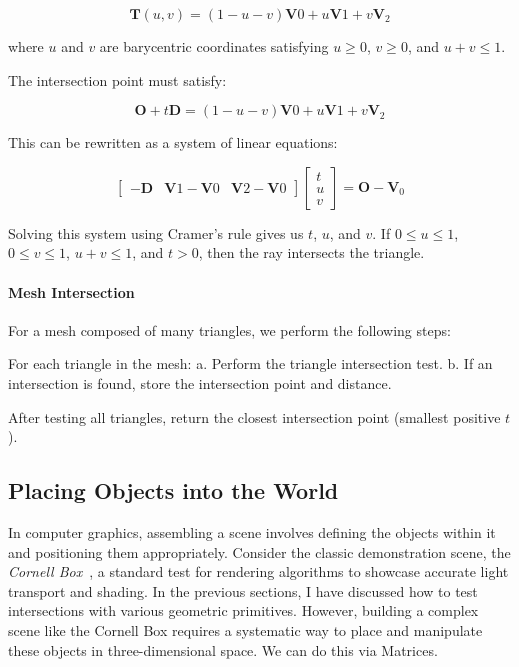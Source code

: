 \documentclass[12pt]{article}
\begin{document}
\[
    \mathbf{T}(u,v) = (1-u-v)\mathbf{V}0 + u\mathbf{V}1 + v\mathbf{V}_2
\]

where \(u\) and \(v\) are barycentric coordinates satisfying \(u \geq 0\), \(v \geq 0\), and \(u + v \leq 1\).

The intersection point must satisfy:

\[
    \mathbf{O} + t\mathbf{D} = (1-u-v)\mathbf{V}0 + u\mathbf{V}1 + v\mathbf{V}_2
\]

This can be rewritten as a system of linear equations:

\[
    \begin{bmatrix}
        -\mathbf{D} & \mathbf{V}1 - \mathbf{V}0 & \mathbf{V}2 - \mathbf{V}0
    \end{bmatrix}
    \begin{bmatrix}
        t \\ u \\ v
    \end{bmatrix}
    = \mathbf{O} - \mathbf{V}_0
\]

Solving this system using Cramer's rule gives us \(t\), \(u\), and \(v\). If \(0 \leq u \leq 1\), \(0 \leq v \leq 1\), \(u + v \leq 1\), and \(t > 0\), then the ray intersects the triangle.

\paragraph{Mesh Intersection}

For a mesh composed of many triangles, we perform the following steps:

For each triangle in the mesh:
a. Perform the triangle intersection test.
b. If an intersection is found, store the intersection point and distance.

After testing all triangles, return the closest intersection point (smallest positive \(t\)).

\subsection{Placing Objects into the World}

In computer graphics, assembling a scene involves defining the objects within it and positioning them appropriately. Consider the classic demonstration scene, the \textit{Cornell Box}~\cite{cornellbox}, a standard test for rendering algorithms to showcase accurate light transport and shading.
In the previous sections, I have discussed how to test intersections with various geometric primitives. However, building a complex scene like the Cornell Box requires a systematic way to place and manipulate these objects in three-dimensional space. We can do this via Matrices.
\end{document}
